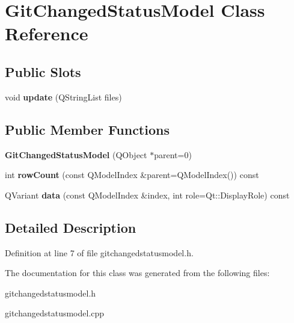 \hypertarget{class_git_changed_status_model}{
\section{GitChangedStatusModel Class Reference}
\label{class_git_changed_status_model}
}
\subsection*{Public Slots}
\begin{DoxyCompactItemize}
\item 
\hypertarget{class_git_changed_status_model_a31a5de432424307598abe8c70f356afb}{
void {\bfseries update} (QStringList files)}
\label{class_git_changed_status_model_a31a5de432424307598abe8c70f356afb}

\end{DoxyCompactItemize}
\subsection*{Public Member Functions}
\begin{DoxyCompactItemize}
\item 
\hypertarget{class_git_changed_status_model_a97d3712db80503cda95dd5060397024d}{
{\bfseries GitChangedStatusModel} (QObject $\ast$parent=0)}
\label{class_git_changed_status_model_a97d3712db80503cda95dd5060397024d}

\item 
\hypertarget{class_git_changed_status_model_a1bf20ddbe4c101f45f402d1c6f053cd8}{
int {\bfseries rowCount} (const QModelIndex \&parent=QModelIndex()) const }
\label{class_git_changed_status_model_a1bf20ddbe4c101f45f402d1c6f053cd8}

\item 
\hypertarget{class_git_changed_status_model_a7df527027e37be6a6519541da5182fcf}{
QVariant {\bfseries data} (const QModelIndex \&index, int role=Qt::DisplayRole) const }
\label{class_git_changed_status_model_a7df527027e37be6a6519541da5182fcf}

\end{DoxyCompactItemize}


\subsection{Detailed Description}


Definition at line 7 of file gitchangedstatusmodel.h.



The documentation for this class was generated from the following files:\begin{DoxyCompactItemize}
\item 
gitchangedstatusmodel.h\item 
gitchangedstatusmodel.cpp\end{DoxyCompactItemize}
